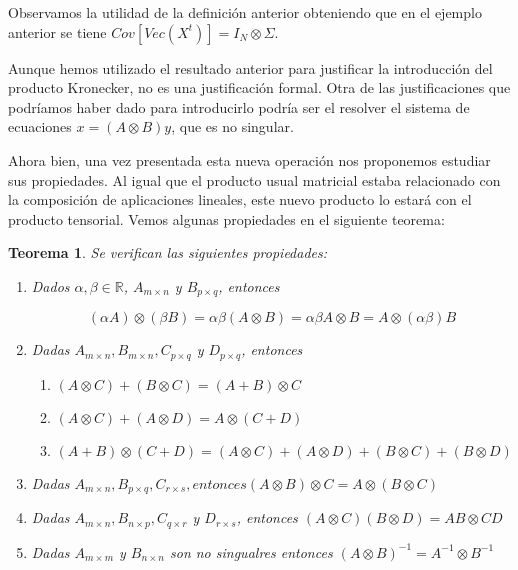 \documentclass{article}
\theoremstyle{theorem-style}  %
\newtheorem{theorem}{Teorema}[section]  %
\theoremstyle{definition-style}
\theoremstyle{example-style}
\theoremstyle{exercise-style}
\begin{document}
	Observamos la utilidad de la definición anterior obteniendo que en el ejemplo anterior se tiene $Cov[Vec(X^t)] = I_N \otimes \Sigma$.
	
	Aunque hemos utilizado el resultado anterior para justificar la introducción del producto Kronecker, no es una justificación formal. Otra de las justificaciones que podríamos haber dado para introducirlo podría ser  el resolver el sistema de ecuaciones $x = (A \otimes B)y$, que es no singular. 
	
	Ahora bien, una vez presentada esta nueva operación nos proponemos estudiar sus propiedades. Al igual que el producto usual matricial estaba relacionado con la composición de aplicaciones lineales, este nuevo producto lo estará con el producto tensorial. Vemos algunas propiedades en el siguiente teorema:
	
	\begin{theorem}\label{PropKro}
		Se verifican las siguientes propiedades:
		
		\begin{enumerate}
			\item \textit{Dados $\alpha, \beta \in \mathbb{R}$,  $A_{m \times n}$ y $B_{p \times q}$, entonces}
			
			$$(\alpha A) \otimes (\beta B) = \alpha \beta (A \otimes B) = \alpha \beta A \otimes B = A \otimes (\alpha \beta )B$$
			
			\item \textit{Dadas $A_{m \times n}, B_{m \times n}, C_{p \times q}$ y $D_{p \times q}$, entonces}
			\begin{enumerate}
				\item $(A \otimes C)+(B \otimes C) = (A+B) \otimes C$
				\item $(A \otimes C) + (A \otimes D) = A \otimes (C+D)$
				\item $(A + B) \otimes (C+D) = (A \otimes C) + (A \otimes D) + (B \otimes C) + (B \otimes D)$
			\end{enumerate}
			
			\item \textit{Dadas $A_{m \times n}, B_{p \times q}, C_{r \times s}, entonces (A \otimes B) \otimes C = A \otimes (B \otimes C)$}
			
			\item \textit{Dadas $A_{m \times n}, B_{n \times p}, C_{q \times r}$ y $D_{r \times s}$, entonces $(A \otimes C)(B \otimes D) = AB \otimes CD$}
			
			\item \textit{Dadas $A_{m \times m}$ y $B_{n \times n}$ son no singualres entonces $(A \otimes B)^{-1} = A^{-1} \otimes B^{-1}$}
			

\end{enumerate}
\end{theorem}
\end{document}
